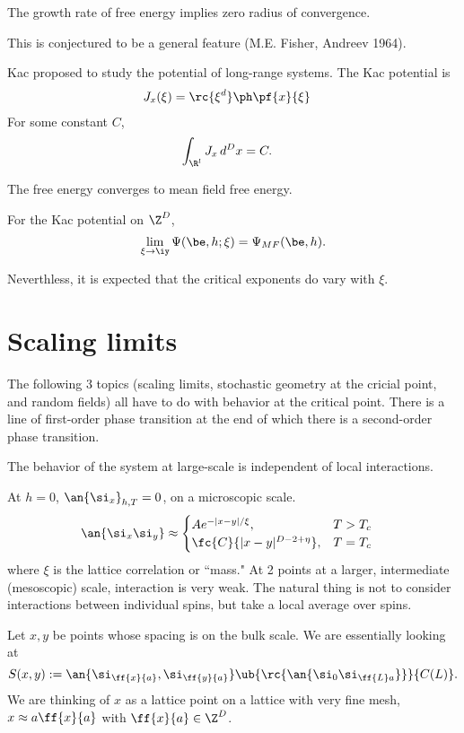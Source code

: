 The growth rate of free energy implies zero radius of convergence.

This is conjectured to be a general feature (M.E. Fisher, Andreev 1964). 

Kac proposed to study the potential of long-range systems. The Kac potential is 
\begin{align}
J_x(\xi) &= \rc{\xi^d}\ph\pf{x}{\xi}
\end{align}
For some constant $C$,
\begin{align}
\int_{\R^l} J_x\,d^Dx &=C.
\end{align}

The free energy converges to mean field free energy.

\begin{thm}
For the Kac potential on $\Z^D$, 
\[
\lim_{\xi\to \iy} \Psi(\be, h;\xi) = \Psi_{MF} (\be, h).
\]
\end{thm}

Neverthless, it is expected that the critical exponents do vary with $\xi$.




\section{Scaling limits}
The following 3 topics (scaling limits, stochastic geometry at the cricial point, and random fields) all have to do with behavior at the critical point. There is a line of first-order phase transition at the end of which there is a second-order phase transition.

The behavior of the system at large-scale is independent of local interactions.

At $h=0$, $\an{\si_x}_{h,T}=0$, on a microscopic scale.
\begin{align}\label{eq:sl-corr}
\an{\si_x\si_y} &\approx \begin{cases}
A e^{-|x-y|/\xi},&T>T_c\\
\fc{C}{|x-y|^{D-2+\eta}},&T=T_c
\end{cases}
\end{align}
where $\xi$ is the lattice correlation or ``mass."
At 2 points at a larger, intermediate (mesoscopic) scale, interaction is very weak. The natural thing is not to consider interactions between individual spins, but take a local average over spins. 

Let $x,y$ be points whose spacing is on the bulk scale. 
We are essentially looking at 
\[
S(x,y):=\an{\si_{\ff{x}{a}}, \si_{\ff{y}{a}}}\ub{\rc{\an{\si_0\si_{\ff{L}a}}}}{C(L)}.
\]
We are thinking of $x$ as a lattice point on a lattice with very fine mesh, $x\approx a\ff{x}{a}$ with $\ff{x}{a}\in \Z^D$. 

